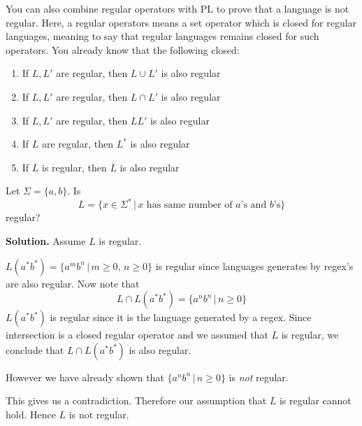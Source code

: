 



\newpage
You can also combine regular operators with PL to prove that a language
is not regular.
Here, a regular operators means a set operator which is closed
for regular languages, meaning to say that regular languages remains
closed for such operators.
You already know that the following closed:
\begin{enumerate}[topsep=0mm]
\item If $L,L'$ are regular, then $L \cup L'$ is also regular
\item If $L,L'$ are regular, then $L \cap L'$ is also regular
\item If $L,L'$ are regular, then $LL'$ is also regular
\item If $L$ are regular, then $L^*$ is also regular
\item If $L$ is regular, then $\overline{L}$ is also regular
\end{enumerate}


\begin{eg} Let $\Sigma = \{a,b\}$.
Is 
\[
L = \{ x \in \Sigma^* \,|\, x \text{ has same number of $a$'s
and $b$'s} \}
\]
regular?
\end{eg}

\textbf{Solution.} Assume $L$ is regular.

$L(a^*b^*) = \{a^mb^n\,|\, m\geq 0, \, n \geq 0\}$ is 
regular since languages generates by regex's are also regular.
Now note that
\[
L \cap L(a^*b^*) = \{a^nb^n \,|\, n \geq 0\}
\]
$L(a^*b^*)$ is regular since it is the language generated by a regex.
Since intersection is a closed regular operator and we assumed that
$L$ is regular, we conclude that $L \cap L(a^*b^*)$ is also regular.

However we have already shown that $\{a^nb^n \,|\, n \geq 0\}$ is
\textit{not} regular.

This gives us a contradiction.
Therefore our assumption that $L$ is regular cannot hold.
Hence $L$ is not regular.






\vspace{0.1in}


\vspace{0.1in}


